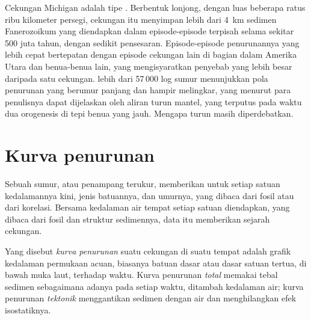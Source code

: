 Cekungan Michigan adalah tipe . Berbentuk lonjong, dengan luas beberapa ratus ribu
kilometer persegi, cekungan itu menyimpan lebih dari \qty{4}{km} sedimen Fanerozoikum yang diendapkan
dalam episode-episode terpisah selama sekitar 500 juta tahun, dengan sedikit pensesaran. Episode-episode
penurunannya yang lebih cepat bertepatan dengan episode cekungan lain di bagian dalam Amerika Utara dan benua-benua
lain, yang mengisyaratkan penyebab yang lebih besar daripada satu cekungan.  lebih dari 57\,000
log sumur menunjukkan pola penurunan yang berumur panjang dan hampir melingkar, yang menurut para penulisnya dapat dijelaskan oleh
aliran turun mantel, yang terputus pada waktu dua orogenesis di tepi
benua yang jauh. Mengapa  turun masih diperdebatkan.

\section{Kurva penurunan}\label{sec:b2:basins-compared:curves}

Sebuah sumur, atau penampang terukur, memberikan untuk setiap satuan kedalamannya kini, jenis batuannya, dan umurnya,
yang dibaca dari fosil atau dari korelasi. Bersama kedalaman air tempat setiap satuan
diendapkan, yang dibaca dari fosil dan struktur sedimennya, data itu memberikan sejarah cekungan.

\begin{definition}\label{def:b2:basins-compared:curve}
Yang disebut \emph{kurva penurunan} suatu cekungan di suatu tempat adalah grafik kedalaman
permukaan acuan, biasanya batuan dasar atau dasar satuan tertua, di bawah muka laut,
terhadap waktu. Kurva penurunan \emph{total} memakai tebal sedimen sebagaimana adanya pada setiap
waktu, ditambah kedalaman air; kurva penurunan \emph{tektonik} menggantikan sedimen dengan air
dan menghilangkan efek isostatiknya.
\end{definition}

